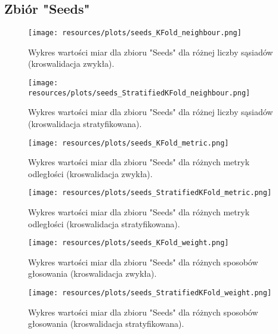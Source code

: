 \subsection{Zbiór "Seeds"}
    \begin{figure}[H]
        \center
        \texttt{[image: resources/plots/seeds\_KFold\_neighbour.png]}
        \caption{Wykres wartości miar dla zbioru "Seeds" dla różnej liczby sąsiadów (kroswalidacja zwykła).}
    \end{figure}

    \begin{figure}[H]
        \center
        \texttt{[image: resources/plots/seeds\_StratifiedKFold\_neighbour.png]}
        \caption{Wykres wartości miar dla zbioru "Seeds" dla różnej liczby sąsiadów (kroswalidacja stratyfikowana).}
    \end{figure}

    \pagebreak

    \begin{figure}[H]
        \center
        \texttt{[image: resources/plots/seeds\_KFold\_metric.png]}
        \caption{Wykres wartości miar dla zbioru "Seeds" dla różnych metryk odległości (kroswalidacja zwykła).}
    \end{figure}

    \begin{figure}[H]
        \center
        \texttt{[image: resources/plots/seeds\_StratifiedKFold\_metric.png]}
        \caption{Wykres wartości miar dla zbioru "Seeds" dla różnych metryk odległości (kroswalidacja stratyfikowana).}
    \end{figure}

    \pagebreak

    \begin{figure}[H]
        \center
        \texttt{[image: resources/plots/seeds\_KFold\_weight.png]}
        \caption{Wykres wartości miar dla zbioru "Seeds" dla różnych sposobów głosowania (kroswalidacja zwykła).}
    \end{figure}

    \begin{figure}[H]
        \center
        \texttt{[image: resources/plots/seeds\_StratifiedKFold\_weight.png]}
        \caption{Wykres wartości miar dla zbioru "Seeds" dla różnych sposobów głosowania (kroswalidacja stratyfikowana).}
    \end{figure}
